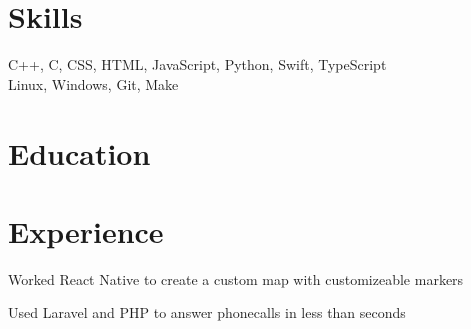 \documentclass[]{deedy-resume-openfont}
\begin{document}
\hfill
\begin{minipage}[t]{0.95\textwidth}


\section{Skills}
C++, C, CSS, HTML, JavaScript, Python, Swift, TypeScript\\
Linux, Windows, Git, Make


\section{Education} 






\section{Experience}



\vspace{\topsep} %
\begin{tightemize}
\item Worked React Native to create a custom map with customizeable markers
\item Used Laravel and PHP to answer phonecalls in less than seconds
\end{tightemize}


\end{minipage}
\end{document}
